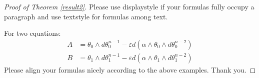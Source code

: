 \documentclass{aims} %
\theoremstyle{definition}
\newcommand{\ep}{\varepsilon}
\begin{document}
\begin{proof}[Proof of Theorem \ref{result2}]
Please use displaystyle if your formulas fully occupy a paragraph and use textstyle for formulas among text.

For two equations:
\begin{align*}
  A & = \theta_0 \wedge d\theta_0^{n-1}
      - \ep d(\alpha \wedge \theta_0 \wedge d\theta_0^{n-2}) \\
  B & =\theta_1 \wedge d\theta_1^{n-1}
      - \ep d(\alpha \wedge \theta_1 \wedge d\theta_1^{n-2})
\end{align*}
Please align your formulas nicely according to the above examples. Thank you.
\end{proof}






\end{document}
